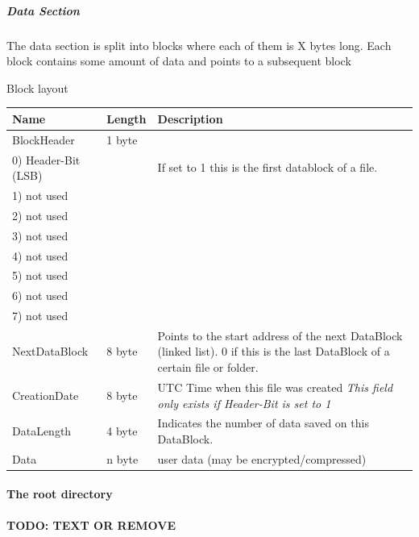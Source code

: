 \subparagraph{Data Section}
The data section is split into blocks where each of them is X bytes long.
Each block contains some amount of data and points to a subsequent block


Block layout \\

\begin{tabular}{|l|l|p{5cm}|}
\hline
  \textbf{Name} & \textbf{Length} & \textbf{Description}
\\  \hline
 BlockHeader & 1 byte & 
 \\
 \hspace{0.2cm} 0) Header-Bit (LSB) & &  If set to 1 this is the first datablock
 of a file.
 \\ 
 \hspace{0.2cm} 1) not used & &  
 \\ 
 \hspace{0.2cm} 2) not used & &  
 \\ 
 \hspace{0.2cm} 3) not used & &  
 \\ 
 \hspace{0.2cm} 4) not used & &  
 \\ 
 \hspace{0.2cm} 5) not used & &  
 \\ 
 \hspace{0.2cm} 6) not used & &  
 \\ 
 \hspace{0.2cm} 7) not used & &  
 
\\  \hline
 NextDataBlock & 8 byte & 
 Points to the start address of the next DataBlock (linked list).
    0 if this is the last DataBlock of a certain file or folder.
\\  \hline
  CreationDate & 8 byte & UTC Time when this file was created
  \newline \textit{This field only exists if Header-Bit is set to 1}
\\  \hline

  DataLength & 4 byte &
    Indicates the number of data saved on this DataBlock.
    
\\  \hline
 Data & n byte & user data (may be encrypted/compressed)
\\  \hline
\end{tabular}


\paragraph{The root directory}
\textbf{TODO: TEXT OR REMOVE}

